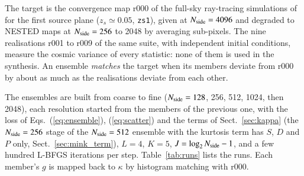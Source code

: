\documentclass{aa}
\newcommand{\nside}{N_{\rm side}}
\begin{document}
The target is the convergence map r000 of the full-sky ray-tracing simulations of \citet{takahashi2017} for the first source plane ($z_s\simeq0.05$, \texttt{zs1}), given at $\nside=4096$ and degraded to NESTED maps at $\nside=256$ to 2048 by averaging sub-pixels. The nine realisations r001 to r009 of the same suite, with independent initial conditions, measure the cosmic variance of every statistic: none of them is used in the synthesis. An ensemble \emph{matches} the target when its members deviate from r000 by about as much as the realisations deviate from each other.

The ensembles are built from coarse to fine ($\nside=128$, 256, 512, 1024, then 2048), each resolution started from the members of the previous one, with the loss of Eqs.~(\ref{eq:ensemble}), (\ref{eq:scatter}) and the terms of Sect.~\ref{sec:kappa} (the $\nside=256$ stage of the $\nside=512$ ensemble with the kurtosis term has $S$, $D$ and $P$ only, Sect.~\ref{sec:mink_term}), $L=4$, $K=5$, $J=\log_2\nside-1$, and a few hundred L-BFGS iterations per step. Table~\ref{tab:runs} lists the runs. Each member's $g$ is mapped back to $\kappa$ by histogram matching with r000.
\end{document}
